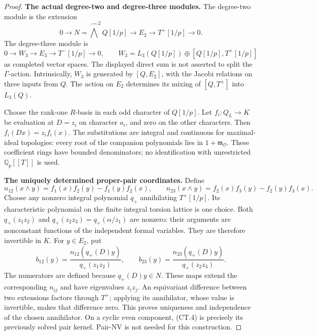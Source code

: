 \begin{proof}
\par\medskip\noindent\textbf{The actual degree-two and degree-three modules.}
The degree-two module is the extension
\[
 0\longrightarrow N=\widehat{\bigwedge}^{2}Q[1/p]
 \longrightarrow E_2\longrightarrow T^+[1/p]\longrightarrow0.
 \tag{CT.2}
\]
The degree-three module is
\[
 0\longrightarrow W_3\longrightarrow E_3
 \longrightarrow T^-[1/p]\longrightarrow0,
 \qquad
 W_3=L_3(Q[1/p])\oplus[Q[1/p],T^+[1/p]]
 \tag{CT.3}
\]
as completed vector spaces. The displayed direct sum is not asserted to
split the \(\Gamma\)-action. Intrinsically, \(W_3\) is generated by
\([Q,E_2]\), with the Jacobi relations on three inputs from \(Q\).
The action on \(E_2\) determines its mixing of \([Q,T^+]\) into
\(L_3(Q)\).

Choose the rank-one \(R\)-basis in each odd character of \(Q[1/p]\).
Let \(f_i:Q_L\to K\) be evaluation at \(D=z_i\) on character
\(a_i\), and zero on the other characters. Then
\(f_i(Dx)=z_i f_i(x)\). The substitutions are integral and continuous
for maximal-ideal topologies: every root of the companion polynomials
lies in \(1+\mathfrak m_{\mathcal O}\). These coefficient rings have
bounded denominators; no identification with unrestricted
\(\mathbb Q_p[[T]]\) is used.

\par\medskip\noindent\textbf{The uniquely determined proper-pair coordinates.}
Define
\[
 n_{12}(x\wedge y)=f_1(x)f_2(y)-f_1(y)f_2(x),\qquad
 n_{23}(x\wedge y)=f_2(x)f_3(y)-f_2(y)f_3(x).
\]
Choose any nonzero integral polynomial \(q_+\) annihilating
\(T^+[1/p]\). Its characteristic polynomial on the finite integral
torsion lattice is one choice. Both
\(q_+(z_1z_2)\) and \(q_+(z_2z_3)=q_+(\alpha/z_1)\) are nonzero:
their arguments are nonconstant functions of the independent formal
variables. They are therefore invertible in \(K\). For \(y\in E_2\), put
\[
 b_{12}(y)=\frac{n_{12}(q_+(D)y)}{q_+(z_1z_2)},\qquad
 b_{23}(y)=\frac{n_{23}(q_+(D)y)}{q_+(z_2z_3)}.
 \tag{CT.4}
\]
The numerators are defined because \(q_+(D)y\in N\). These maps extend
the corresponding \(n_{ij}\) and have eigenvalues \(z_iz_j\).
An equivariant difference between two extensions factors through
\(T^+\); applying its annihilator, whose value is invertible, makes
that difference zero. This proves uniqueness and independence of the
chosen annihilator. On a cyclic even component, (CT.4) is precisely its
previously solved pair kernel. Pair-NV is not needed for this construction.


\end{proof}
